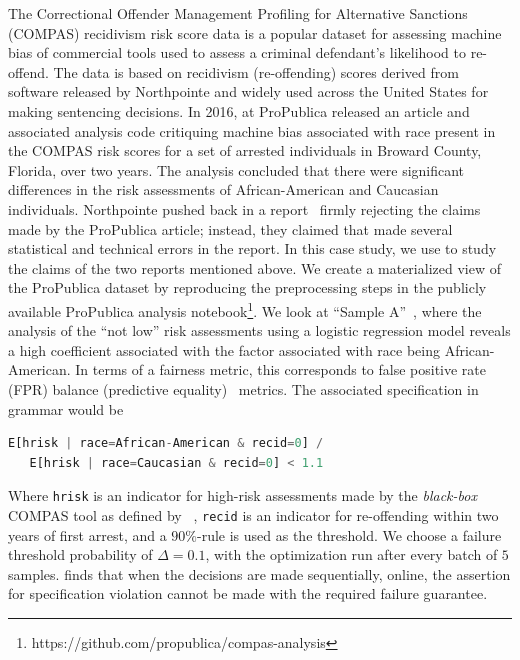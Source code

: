The Correctional Offender Management Profiling for
Alternative Sanctions (COMPAS) recidivism risk score data is a popular dataset for assessing machine bias of commercial tools used to assess a criminal defendant's likelihood to re-offend.
The data is based on recidivism (re-offending) scores derived from software released by Northpointe and widely used across the United States for making sentencing decisions.
In 2016, \citet{angwin2016machine} at ProPublica released an article and associated analysis code critiquing machine bias associated with race present in the COMPAS risk scores for a set of arrested individuals in Broward County, Florida, over two years.
The analysis concluded that there were significant differences in the risk assessments of African-American and Caucasian individuals.
Northpointe pushed back in a report~\citep{dieterich2016compas} firmly rejecting the claims made by the ProPublica article; instead, they claimed that \citet{angwin2016machine} made several statistical and technical errors in the report.
In this case study, we use \AVOIRmethodname{} to study the claims of the two reports mentioned above. 
We create a materialized view of the ProPublica dataset by reproducing the preprocessing steps in the publicly available ProPublica analysis  notebook\footnote{https://github.com/propublica/compas-analysis}.
We look at ``Sample A''~\citep{dieterich2016compas}, where the analysis of the ``not low'' risk assessments using a logistic regression model reveals a high coefficient associated with the factor associated with race being African-American.
In terms of a fairness metric, this corresponds to false positive rate (FPR) balance (predictive equality)~\citep{verma2018fairness} metrics. 
The associated specification in \AVOIRmethodname{} grammar would be

\begin{lstlisting}[columns=flexible, language=Python, basicstyle=\small]
   E[hrisk | race=African-American & recid=0] / 
   E[hrisk | race=Caucasian & recid=0] < 1.1
\end{lstlisting}

Where \verb|hrisk| is an indicator for high-risk assessments made by the \emph{black-box} COMPAS tool as defined by ~\citet{angwin2016machine},  \verb|recid| is an indicator for re-offending within two years of first arrest, and a $90\%$-rule is used as the threshold. 
We choose a failure threshold probability of $\Delta = 0.1$, with the optimization run after every batch of $5$ samples.
\AVOIRmethodname{} finds that when the decisions are made sequentially, online, the assertion for specification violation cannot be made with the required failure guarantee.

